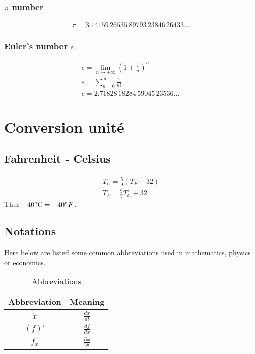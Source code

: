 \subsection{$\pi$ number}
\begin{eqnarray}
	\pi = 3.14159\,26535\,89793\,23846\,26433\ldots
\end{eqnarray}
\subsection{Euler's number $e$}
\begin{eqnarray}
	e=\lim_{n\rightarrow+\infty}\left(1+\frac{1}{n}\right)^n\\
	e=\sum_{n=0}^{\infty}\frac{1}{n!}\\
	e=2.71828\,18284\,59045\,23536\ldots\,
\end{eqnarray}

\chapter{Conversion unité}
\section{Fahrenheit - Celsius}
\begin{eqnarray}
	T_C=\frac{5}{9}(T_F-32)\\
	T_F=\frac{9}{5}T_C+32
\end{eqnarray}
Thus $-40\celsius=-40\degree F$.

\section{Notations}
Here below are listed some common abbreviations used in mathematics, physics or economics.


\begin{table}[h!]
	\centering
	\begin{tabular}{|c|c|}
		\hline 
		\textbf{Abbreviation}&\textbf{Meaning}\\
		\hline
	    \hline
		$\dot x$ &  $\frac{dx}{dt}$\\ 
		\hline
		$(f)'$ &  $\frac{df}{dx}$\\ 
		\hline
		$f_x$ &  $\frac{\partial x}{\partial t}$\\ 
		\hline
	 \end{tabular}	
	\caption{Abbreviations}
	\label{table:abbreviations}
\end{table}

